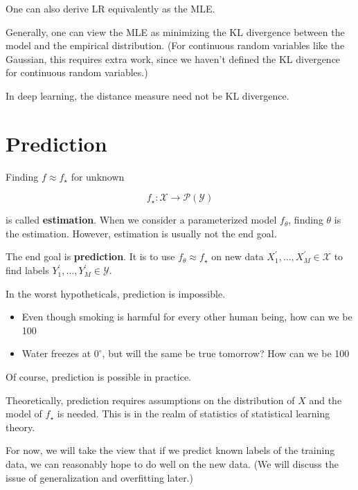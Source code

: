 \documentclass{report}
\begin{document}
\begin{concept}
    One can also derive LR equivalently as the MLE.

    Generally, one can view the MLE as minimizing the KL divergence between the model and the empirical distribution. (For continuous random variables like the Gaussian, this requires extra work, since we haven't defined the KL divergence for continuous random variables.)

    In deep learning, the distance measure need not be KL divergence.
\end{concept}

\section{Prediction}

\begin{definition}
    Finding $f \approx f_{\star}$ for unknown

    $$
    f_{\star}: \mathcal{X} \rightarrow \mathcal{P}(\mathcal{Y})
    $$

    is called \textbf{estimation}. When we consider a parameterized model $f_{\theta}$, finding $\theta$ is the estimation. However, estimation is usually not the end goal.

    The end goal is \textbf{prediction}. It is to use $f_{\theta} \approx f_{\star}$ on new data $X_{1}^{\prime}, \ldots, X_{M}^{\prime} \in \mathcal{X}$ to find labels $Y_{1}^{\prime}, \ldots, Y_{M}^{\prime} \in \mathcal{Y}$.
\end{definition}

\begin{concept}
    In the worst hypotheticals, prediction is impossible.

    \begin{itemize}
        \item Even though smoking is harmful for every other human being, how can we be 100%
        \item Water freezes at $0^{\circ}$, but will the same be true tomorrow? How can we be 100%
    \end{itemize}

    Of course, prediction is possible in practice.

    Theoretically, prediction requires assumptions on the distribution of $X$ and the model of $f_{\star}$ is needed. This is in the realm of statistics of statistical learning theory.

    For now, we will take the view that if we predict known labels of the training data, we can reasonably hope to do well on the new data. (We will discuss the issue of generalization and overfitting later.)
\end{concept}
\end{document}
